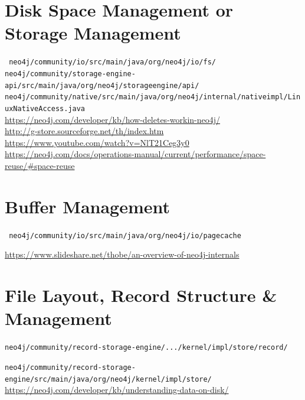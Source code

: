 \documentclass[a4paper,10pt]{article}
\begin{document}
\section{Disk Space Management or Storage Management}
\texttt{
neo4j/community/io/src/main/java/org/neo4j/io/fs/
} \\

\texttt{neo4j/community/storage-engine-api/src/main/java/org/neo4j/storageengine/api/} \\

\texttt{neo4j/community/native/src/main/java/org/neo4j/internal/nativeimpl/LinuxNativeAccess.java} \\

\href{Hpw delete works}{https://neo4j.com/developer/kb/how-deletes-workin-neo4j/} \\

\href{G-Store}{http://g-store.sourceforge.net/th/index.htm} \\

\href{Algorithms \& data structures}{https://www.youtube.com/watch?v=NlT21Ceg3y0}  \\

\href{Reusing space}{https://neo4j.com/docs/operations-manual/current/performance/space-reuse/\#space-reuse} \\


\section{Buffer Management}
\texttt{
neo4j/community/io/src/main/java/org/neo4j/io/pagecache
}

\href{Page Cache layout ??? Outdated ???}{https://www.slideshare.net/thobe/an-overview-of-neo4j-internals} \\


\section{File Layout, Record Structure \& Management}
\texttt{neo4j/community/record-storage-engine/.../kernel/impl/store/record/}

\texttt{neo4j/community/record-storage-engine/src/main/java/org/neo4j/kernel/impl/store/} \\

\href{Layout N4J}{https://neo4j.com/developer/kb/understanding-data-on-disk/} \\
\end{document}
